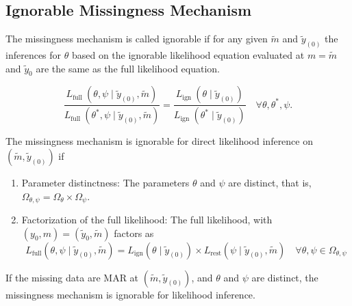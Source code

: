 \subsection{Ignorable Missingness Mechanism}

\begin{definition}
	The missingness mechanism is called ignorable if for any given $\tilde{m}$ and  $\tilde{y}_{(0)}$ the inferences for $\theta$ based on the ignorable likelihood equation evaluated at $m=\tilde{m}$ and $\tilde{y}_{0}$ are the same as the full likelihood equation.
\end{definition}

\begin{remark}
	\begin{equation}
		\frac{L_{\text {full }}\left(\theta, \psi \mid \tilde{y}_{(0)}, \tilde{m}\right)}{L_{\text {full }}\left(\theta^{*}, \psi \mid \tilde{y}_{(0)}, \tilde{m}\right)}=\frac{L_{\text {ign }}\left(\theta \mid \tilde{y}_{(0)}\right)}{L_{\text {ign }}\left(\theta^{*} \mid \tilde{y}_{(0)}\right)} \quad \forall \theta, \theta^{*}, \psi .
	\end{equation}
\end{remark}

\begin{theorem}
	The missingness mechanism is ignorable for direct likelihood inference on $\left(\tilde{m},\tilde{y}_{(0)}\right)$ if
	\begin{enumerate}
		\item Parameter distinctness: The parameters $\theta$ and $\psi$ are distinct, that is, $\Omega_{\theta, \psi}=\Omega_{\theta} \times \Omega_{\psi}$.
		\item Factorization of the full likelihood: The full likelihood, with $\left(y_{0}, m\right)=\left(\tilde{y}_{0}, \tilde{m}\right)$ factors as
		      \begin{equation}
			      L_{\text{full}}\left(\theta,\psi\mid\tilde{y}_{(0)},\tilde{m}\right)=L_{\text{ign}}\left(\theta\mid\tilde{y}_{(0)}\right)\times L_{\text{rest}}\left(\psi\mid\tilde{y}_{(0)},\tilde{m}\right)\quad\forall\theta,\psi\in\Omega_{\theta,\psi}
			      \label{equation:factorization-of-the-full-likelihood}
		      \end{equation}
	\end{enumerate}
\end{theorem}

\begin{corollary}
	If the missing data are MAR at $\left(\tilde{m}, \tilde{y}_{(0)}\right)$, and $\theta$ and $\psi$ are distinct, the missingness mechanism is ignorable for likelihood inference.
\end{corollary}

